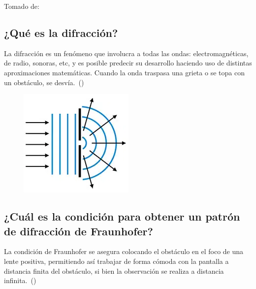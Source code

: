 \documentclass[twocolumn, 12pt]{article}
\begin{document}
Tomado de:~\cite{Fernández}

\subsection{¿Qué es la difracción?}

La difracción es un fenómeno que involucra a todas las
ondas: electromagnéticas, de radio, sonoras, etc, y es
posible predecir su desarrollo haciendo uso de distintas
aproximaciones matemáticas. Cuando la onda traspasa una
grieta o se topa con un obstáculo, se
desvía.~(\cite{J_Gardey_2018})

\begin{figure}[H]
    \includegraphics[width=0.9\linewidth]{./Images/Difraccion.jpg}
    \caption{}
\end{figure}

\subsection{¿Cuál es la condición para obtener un patrón de difracción de Fraunhofer?}

La condición de Fraunhofer se asegura colocando el
obstáculo en el foco de una lente positiva, permitiendo así
trabajar de forma cómoda con la pantalla a distancia finita
del obstáculo, si bien la observación se realiza a
distancia infinita.~(\cite{Optics})
\end{document}
